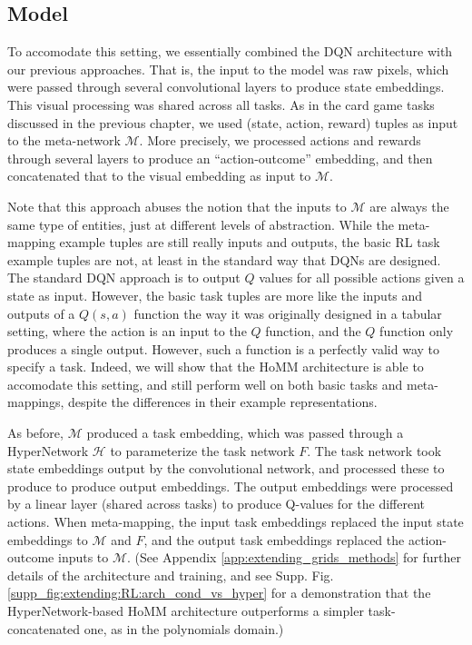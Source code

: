 \subsection{Model} \label{section:extending:RL:model}
To accomodate this setting, we essentially combined the DQN architecture \citep{Mnih2015} with our previous approaches. That is, the input to the model was raw pixels, which were passed through several convolutional layers to produce state embeddings. This visual processing was shared across all tasks. As in the card game tasks discussed in the previous chapter, we used (state, action, reward) tuples as input to the meta-network \(\mathcal{M}\). More precisely, we processed actions and rewards through several layers to produce an ``action-outcome'' embedding, and then concatenated that to the visual embedding as input to \(\mathcal{M}\).\par
Note that this approach abuses the notion that the inputs to \(\mathcal{M}\) are always the same type of entities, just at different levels of abstraction. While the meta-mapping example tuples are still really inputs and outputs, the basic RL task example tuples are not, at least in the standard way that DQNs are designed. The standard DQN approach is to output \(Q\) values for all possible actions given a state as input. However, the basic task tuples are more like the inputs and outputs of a \(Q(s, a)\) function the way it was originally designed in a tabular setting, where the action is an input to the \(Q\) function, and the \(Q\) function only produces a single output. However, such a function is a perfectly valid way to specify a task. Indeed, we will show that the HoMM architecture is able to accomodate this setting, and still perform well on both basic tasks and meta-mappings, despite the differences in their example representations. \par 
As before, \(\mathcal{M}\) produced a task embedding, which was passed through a HyperNetwork \(\mathcal{H}\) to parameterize the task network \(F\). The task network took state embeddings output by the convolutional network, and processed these to produce to produce output embeddings. The output embeddings were processed by a linear layer (shared across tasks) to produce Q-values for the different actions. When meta-mapping, the input task embeddings replaced the input state embeddings to \(\mathcal{M}\) and \(F\), and the output task embeddings replaced the action-outcome inputs to \(\mathcal{M}\). (See Appendix \ref{app:extending_grids_methods} for further details of the architecture and training, and see Supp. Fig. \ref{supp_fig:extending:RL:arch_cond_vs_hyper} for a demonstration that the HyperNetwork-based HoMM architecture outperforms a simpler task-concatenated one, as in the polynomials domain.)\par 
